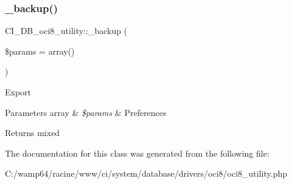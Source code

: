 \subsubsection{\texorpdfstring{\+\_\+backup()}{\_backup()}}
{\footnotesize\ttfamily C\+I\+\_\+\+D\+B\+\_\+oci8\+\_\+utility\+::\+\_\+backup (\begin{DoxyParamCaption}\item[{}]{\$params = {\ttfamily array()} }\end{DoxyParamCaption})\hspace{0.3cm}{\ttfamily [protected]}}

Export


\begin{DoxyParams}[1]{Parameters}
array & {\em \$params} & Preferences \\
\hline
\end{DoxyParams}
\begin{DoxyReturn}{Returns}
mixed 
\end{DoxyReturn}


The documentation for this class was generated from the following file\+:\begin{DoxyCompactItemize}
\item 
C\+:/wamp64/racine/www/ci/system/database/drivers/oci8/oci8\+\_\+utility.\+php\end{DoxyCompactItemize}
